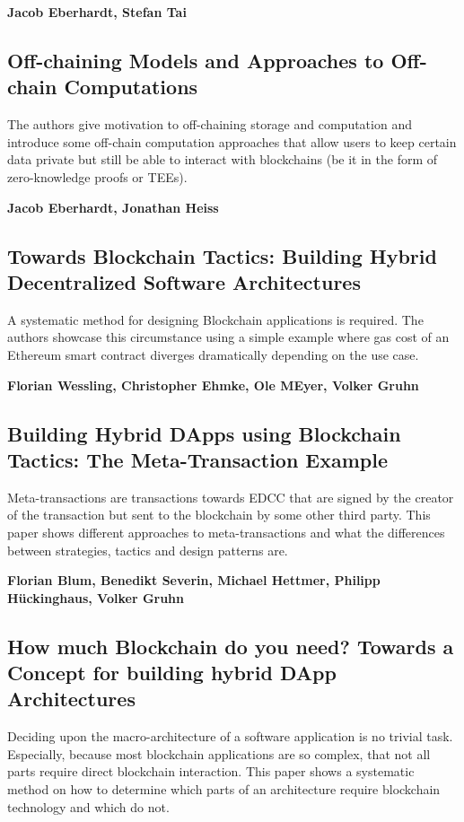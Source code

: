 \textbf{Jacob Eberhardt, Stefan Tai}~\cite{eberhardt17off_block}

\subsection{Off-chaining Models and Approaches to Off-chain Computations}
The authors give motivation to off-chaining storage and computation and introduce some off-chain computation approaches that allow users to keep certain data private but still be able to interact with blockchains (be it in the form of zero-knowledge proofs or TEEs).

\textbf{Jacob Eberhardt, Jonathan Heiss}~\cite{eberhardt18off_model_approac_off_comput}

\subsection{Towards Blockchain Tactics: Building Hybrid Decentralized Software Architectures}
A systematic method for designing Blockchain applications is required. The authors showcase this circumstance using a simple example where gas cost of an Ethereum smart contract diverges dramatically depending on the use case.

\textbf{Florian Wessling, Christopher Ehmke, Ole MEyer, Volker Gruhn}~\cite{towards_blockchain_tactics}

\subsection{Building Hybrid DApps using Blockchain Tactics: The Meta-Transaction Example}
Meta-transactions are transactions towards EDCC that are signed by the creator of the transaction but sent to the blockchain by some other third party. This paper shows different approaches to meta-transactions and what the differences between strategies, tactics and design patterns are.

\textbf{Florian Blum, Benedikt Severin, Michael Hettmer, Philipp Hückinghaus, Volker Gruhn}~\cite{building_hybrid_dapps_using_blockchain_tactics}

\subsection{How much Blockchain do you need? Towards a Concept for building hybrid DApp Architectures}
Deciding upon the macro-architecture of a software application is no trivial task. Especially, because most blockchain applications are so complex, that not all parts require direct blockchain interaction. This paper shows a systematic method on how to determine which parts of an architecture require blockchain technology and which do not.

